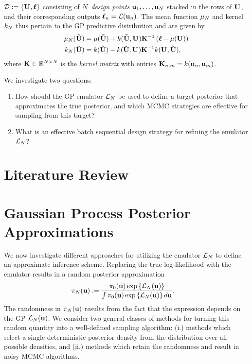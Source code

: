 \documentclass[12pt]{article}
\begin{document}
$\designData := \{\designMat[], \designOutLik\}$ consisting of $\Ndesign$ \textit{design points} 
$\bpar_1, \dots, \bpar_{\Ndesign}$ stacked in the rows of $\designMat[]$, and their corresponding outputs $\designOutLik_{\designIdx} = \llik(\bpar_{\designIdx})$. The 
mean function $\GPMeanPred[\Ndesign]$ and kernel $\GPKerPred[\Ndesign]$ thus pertain to the GP predictive distribution and are given by 
\begin{align*}
\GPMeanPred[\Ndesign](\newInputMat) &= \GPMean(\newInputMat) + \GPKer(\newInputMat, \designMat[]) \KerMat[]^{-1} \left(\designOutLik - \GPMean(\designMat[]) \right) \\
\GPKerPred[\Ndesign](\newInputMat) &= \GPKer(\newInputMat) - \GPKer(\newInputMat, \designMat[]) \KerMat[]^{-1} \GPKer(\designMat[], \newInputMat),
\end{align*}
where $\KerMat[] \in \R^{\Ndesign \times \Ndesign}$ is the \textit{kernel matrix} with entries $\KerMat[n,m] = \GPKer(\bpar_n, \bpar_m)$. 

We investigate two questions: 
\begin{enumerate}
\item How should the GP emulator $\llik_{\Ndesign}$ be used to define a target posterior that approximates the true posterior, and which MCMC 
strategies are effective for sampling from this target?
\item What is an effective batch sequential design strategy for refining the emulator $\llik_{\Ndesign}$? 
\end{enumerate}

\section{Literature Review}

\section{Gaussian Process Posterior Approximations}
We now investigate different approaches for utilizing the emulator $\llik_{\Ndesign}$ to define an approximate inference scheme. Replacing the true log-likelihood 
with the emulator results in a random posterior approximation 
\begin{align}
\postDens_{\Ndesign}(\bpar)
&:= \frac{\priorDens(\bpar) \exp\left\{\llik_{\Ndesign}(\bpar) \right\}}{\int \priorDens(\bpar) \exp\left\{\llik_{\Ndesign}(\bpar) \right\} d\bpar}.
\end{align}
The randomness in $\postDens_{\Ndesign}(\bpar)$ results from the fact that the expression depends on the GP $\llik_{\Ndesign}(\bpar)$. We consider 
two general classes of methods for turning this random quantity into a well-defined sampling algorithm: (i.) methods which select a single deterministic 
posterior density from the distribution over all possible densities, and (ii.) methods which retain the randomness and result in noisy MCMC algorithms. 
\end{document}
